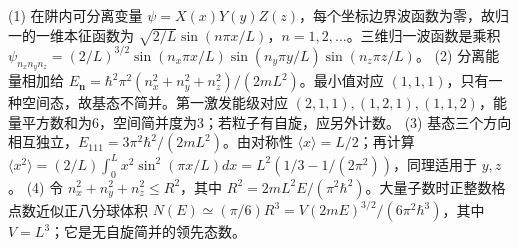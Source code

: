 (1) 在阱内可分离变量 \(\psi=X(x)Y(y)Z(z)\)，每个坐标边界波函数为零，故归一的一维本征函数为 \(\sqrt{2/L}\sin(n\pi x/L)\)，\(n=1,2,\ldots\)。三维归一波函数是乘积 \(\psi_{n_xn_yn_z}=(2/L)^{3/2}\sin(n_x\pi x/L)\sin(n_y\pi y/L)\sin(n_z\pi z/L)\)。
(2) 分离能量相加给 \(E_{\mathbf n}=\hbar^2\pi^2(n_x^2+n_y^2+n_z^2)/(2mL^2)\)。最小值对应 \((1,1,1)\)，只有一种空间态，故基态不简并。第一激发能级对应 \((2,1,1),(1,2,1),(1,1,2)\)，能量平方数和为6，空间简并度为3；若粒子有自旋，应另外计数。
(3) 基态三个方向相互独立，\(E_{111}=3\pi^2\hbar^2/(2mL^2)\)。由对称性 \(\langle x\rangle=L/2\)；再计算 \(\langle x^2\rangle=(2/L)\int_0^L x^2\sin^2(\pi x/L)dx=L^2(1/3-1/(2\pi^2))\)，同理适用于 \(y,z\)。
(4) 令 \(n_x^2+n_y^2+n_z^2\le R^2\)，其中 \(R^2=2mL^2E/(\pi^2\hbar^2)\)。大量子数时正整数格点数近似正八分球体积 \(N(E)\simeq(\pi/6)R^3=V(2mE)^{3/2}/(6\pi^2\hbar^3)\)，其中 \(V=L^3\)；它是无自旋简并的领先态数。
